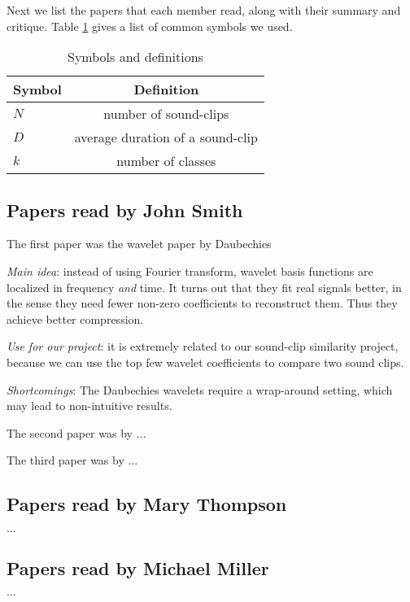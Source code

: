 Next we list the papers that each member read,
along with their summary and critique.
Table \ref{tab:symbols} gives a list of common symbols we used.

\begin{table}[htb]
\begin{center} 
\begin{tabular}{|l | c | } \hline \hline 
Symbol & Definition \\ \hline
$N$ & number of sound-clips \\
$D$ & average duration of a sound-clip \\
$k$  & number of classes \\ \hline
\end{tabular} 
\end{center} 
\caption{Symbols and definitions}
\label{tab:symbols} 
 \end{table} 


\subsection{Papers read by John Smith}
The first paper was the wavelet paper by Daubechies
\cite{Daubechies92Ten}
\begin{itemize*}
\item {\em Main idea}: instead of using Fourier transform,
      wavelet basis functions are localized in frequency {\em and} time.
      It turns out that they fit real signals better,
      in the sense they need fewer non-zero coefficients to reconstruct
      them. Thus they achieve better compression.
\item {\em Use for our project}:
      it is extremely related to our sound-clip similarity
      project, because we can use the top few wavelet coefficients
      to compare two sound clips.
\item {\em Shortcomings}:
      The Daubechies wavelets require a wrap-around setting,
      which may lead to non-intuitive results.
\end{itemize*}

The second paper was by $\ldots$

The third paper was by $\ldots$

\subsection{Papers read by Mary Thompson }

$\ldots$

\subsection{Papers read by  Michael Miller }

$\ldots$
